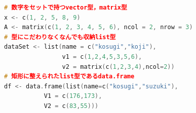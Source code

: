 \begin{lstlisting}[language=c++,label={code:16_12x},caption={さまざまなデータの型}]
# 数字をセットで持つvector型，matrix型
x <- c(1, 2, 5, 8, 9)
A <- matrix(c(1, 2, 3, 4, 5, 6), ncol = 2, nrow = 3)
# 型にこだわりなくなんでも収納list型
dataSet <- list(name = c("kosugi","koji"),
                v1 = c(1,2,4,5,3,5,6),
                v2 = matrix(c(1,2,3,4),ncol=2))
# 矩形に整えられたlist型であるdata.frame
df <- data.frame(list(name=c("kosugi","suzuki"),
           V1 = c(176,173),
           V2 = c(83,55)))
\end{lstlisting}
